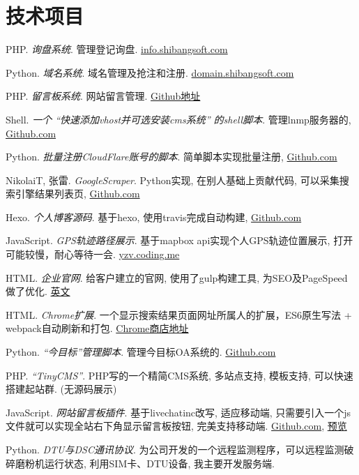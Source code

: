 \section{\textbf{技术项目}}
 \resumeSubHeadingListStart
   \item{
       PHP.
       \emph{询盘系统}.
       管理登记询盘. \href{http://info.shibangsoft.com}{info.shibangsoft.com}
   }
   \item{
       Python.
       \emph{域名系统}.
       域名管理及抢注和注册. \href{http://domain.shibangsoft.com}{domain.shibangsoft.com}
   }
   \item{
       PHP.
       \emph{留言板系统}.
       网站留言管理.  \href{https://github.com/leadscloud/inquiry}{Github地址}
   }
   \item{
       Shell.
       \emph{一个 ``快速添加vhost并可选安装cms系统'' 的shell脚本}.
       管理lnmp服务器的, \href{https://github.com/leadscloud/Tools}{Github.com}
   }
   \item{
       Python.
       \emph{批量注册CloudFlare账号的脚本}.
       简单脚本实现批量注册, \href{https://github.com/leadscloud/cloudflare}{Github.com}
   }
   \item{
       NikolaiT, 张雷.
       \emph{GoogleScraper}.
       Python实现, 在别人基础上贡献代码, 可以采集搜索引擎结果列表页, \href{https://github.com/NikolaiT/GoogleScraper/blob/master/AUTHORS}{Github.com}
   }
   \item{
       Hexo.
       \emph{个人博客源码}.
       基于hexo, 使用travis完成自动构建, \href{https://github.com/leadscloud/leadscloud.github.io/tree/source}{Github.com}
   }
   \item{
       JavaScript.
       \emph{GPS轨迹路径展示}.
       基于mapbox api实现个人GPS轨迹位置展示, 打开可能较慢，耐心等待一会. \href{http://yzv.coding.me/#portfolio/portfolio-4}{yzv.coding.me}
   }
   \item{
       HTML.
       \emph{企业官网}.
       给客户建立的官网, 使用了gulp构建工具, 为SEO及PageSpeed做了优化. \href{https://www.kamychina.com/}{英文}
   }
   \item{
       HTML.
       \emph{Chrome扩展}.
       一个显示搜索结果页面网址所属人的扩展，ES6原生写法 + webpack自动刷新和打包. \href{https://chrome.google.com/webstore/detail/ifbiiojnbgljbjffmacihhdkeomdkifc}{Chrome商店地址}
   }
   \item{
       Python.
       \emph{``今目标''管理脚本}.
       管理今目标OA系统的. \href{https://github.com/leadscloud/Jingoal}{Github.com}
   }
   \item{
       PHP.
       \emph{``TinyCMS''}.
       PHP写的一个精简CMS系统, 多站点支持, 模板支持, 可以快速搭建起站群. (无源码展示)
   }
   \item{
       JavaScript.
       \emph{网站留言板插件}.
       基于livechatinc改写, 适应移动端, 只需要引入一个js文件就可以实现全站右下角显示留言板按钮, 完美支持移动端. \href{https://github.com/leadscloud/leadscloud.github.io/tree/master/livechat}{Github.com},
       \href{http://www.barrettbatemanfoundation.org/}{预览}
   }
   \item{
       Python.
       \emph{DTU与DSC通讯协议}.
       为公司开发的一个远程监测程序，可以远程监测破碎磨粉机运行状态, 利用SIM卡、DTU设备, 我主要开发服务端.
   }

 \resumeSubHeadingListEnd
